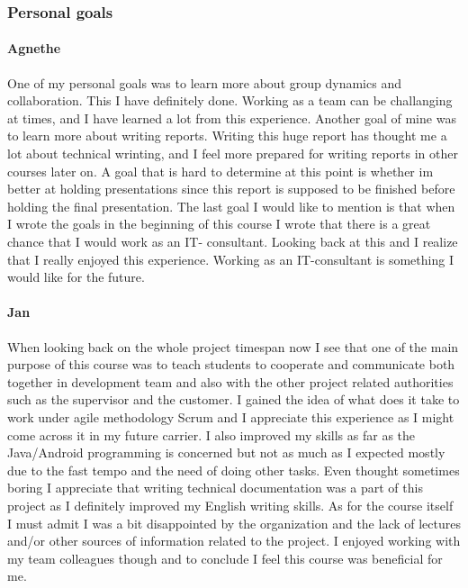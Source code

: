 \subsubsection{Personal goals}

\paragraph{Agnethe}
One of my personal goals was to learn more about group dynamics and collaboration. This I have definitely done. Working as a team can be challanging at times, and I have learned a lot from this experience. Another goal of mine was to learn more about writing reports. Writing this huge report has thought me a lot about technical wrinting, and I feel more prepared for writing reports in other courses later on. A goal that is hard to determine at this point is whether im better at holding presentations since this report is supposed to be finished before holding the final presentation. The last goal I would like to mention is that when I wrote the goals in the beginning of this course I wrote that  there is a great chance that I would work as an IT- consultant. Looking back at this and I realize that I really enjoyed this experience. Working as an IT-consultant is something I would like for the future. 

\paragraph{Jan}
When looking back on the whole project timespan now I see that one of the main purpose of this course was to teach students to cooperate and communicate both together in development team and also with the other project related authorities such as the supervisor and the customer. I gained the idea of what does it take to work under agile methodology Scrum and I appreciate this experience as I might come across it in my future carrier. I also improved my skills as far as the Java/Android programming is concerned but not as much as I expected mostly due to the fast tempo and the need of doing other tasks. Even thought sometimes boring I appreciate that writing technical documentation was a part of this project as I definitely improved my English writing skills. As for the course itself I must admit I was a bit disappointed by the organization and the lack of lectures and/or other sources of information related to the project. I enjoyed working with my team colleagues though and to conclude I feel this course was beneficial for me.

